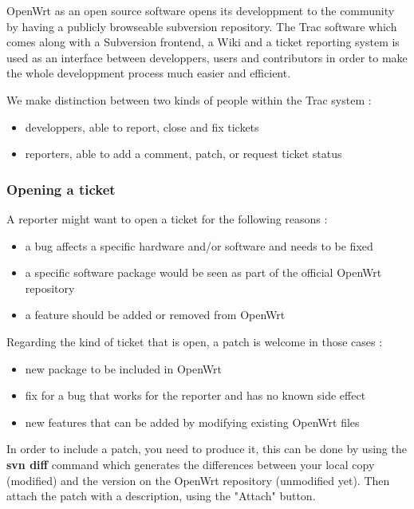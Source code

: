 OpenWrt as an open source software opens its developpment to the community by having a publicly browseable subversion repository. The Trac software which comes along with a Subversion frontend,  a Wiki and a ticket reporting system is used as an interface between developpers, users and contributors in order to make the whole developpment process much easier and efficient.

We make distinction between two kinds of people within the Trac system :

\begin{itemize}
\item developpers, able to report, close and fix tickets
\item reporters, able to add a comment, patch, or request ticket status
\end{itemize}

\subsubsection{Opening a ticket}

A reporter might want to open a ticket for the following reasons :

\begin{itemize}
\item a bug affects a specific hardware and/or software and needs to be fixed
\item a specific software package would be seen as part of the official OpenWrt repository
\item a feature should be added or removed from OpenWrt
\end{itemize}

Regarding the kind of ticket that is open, a patch is welcome in those cases :

\begin{itemize}
\item new package to be included in OpenWrt
\item fix for a bug that works for the reporter and has no known side effect
\item new features that can be added by modifying existing OpenWrt files
\end{itemize}

In order to include a patch, you need to produce it, this can be done by using the \textbf{svn diff} command which generates the differences between your local copy (modified) and the version on the OpenWrt repository (unmodified yet). Then attach the patch with a description, using the "Attach" button.


